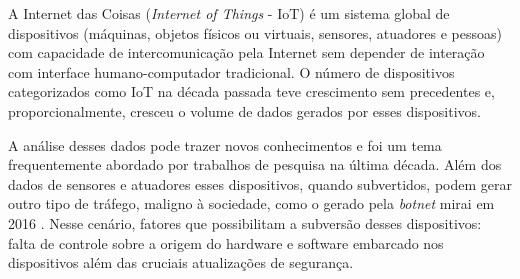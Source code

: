 

% 
% 



A Internet das Coisas (\emph{Internet of Things} - IoT) é um sistema global de
dispositivos (máquinas, objetos físicos ou virtuais, sensores, atuadores e
pessoas) com capacidade de intercomunicação pela Internet sem depender de
interação com interface humano-computador tradicional.
O número de dispositivos categorizados como IoT na década passada teve
crescimento sem precedentes e, proporcionalmente, cresceu o volume de dados
gerados por esses dispositivos.

A análise desses dados pode trazer novos conhecimentos e foi um tema frequentemente
abordado por trabalhos de pesquisa na última década.
Além dos dados de sensores e atuadores esses dispositivos, quando subvertidos,
podem gerar outro tipo de tráfego, maligno à sociedade, como o gerado pela
\emph{botnet} mirai em 2016 \cite{Kambourakis2017}.
Nesse cenário, fatores que possibilitam a subversão desses dispositivos:
falta de controle sobre a origem do hardware e software embarcado nos
dispositivos além das cruciais atualizações de segurança.

